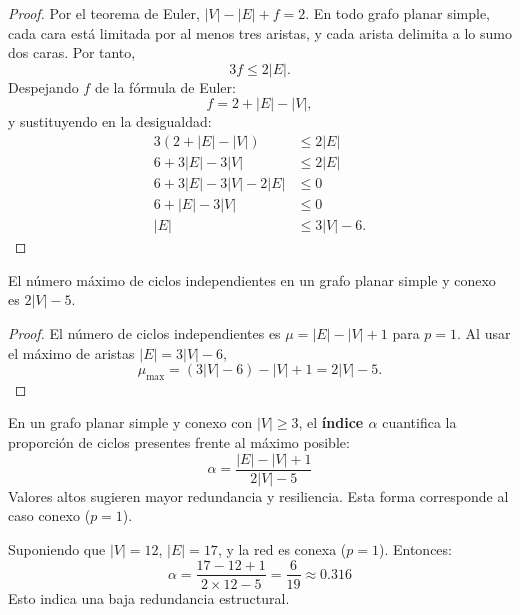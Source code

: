             \begin{proof}
                Por el teorema de Euler, $|V| - |E| + f = 2$.
                En todo grafo planar simple, cada cara está limitada por al menos tres aristas, y cada arista delimita a lo sumo dos caras. Por tanto,
                \[
                3f \leq 2|E|.
                \]
                Despejando $f$ de la fórmula de Euler:
                \[
                f = 2 + |E| - |V|,
                \]
                y sustituyendo en la desigualdad:
                \begin{align*}
                3(2 + |E| - |V|) &\leq 2|E| \\
                6 + 3|E| - 3|V| &\leq 2|E| \\
                6 + 3|E| - 3|V| - 2|E| &\leq 0 \\
                6 + |E| - 3|V| &\leq 0 \\
                |E| &\leq 3|V| - 6.
                \end{align*}
            \end{proof}

            \begin{corolario}
                El número máximo de ciclos independientes en un grafo planar simple y conexo es $2|V| - 5$.
            \end{corolario}

            \begin{proof}
                El número de ciclos independientes es $\mu = |E| - |V| + 1$ para $p=1$.
                Al usar el máximo de aristas $|E| = 3|V|-6$,
                \[
                \mu_{\max} = (3|V|-6) - |V| + 1 = 2|V| - 5.
                \]
            \end{proof}

            \begin{definicion}
                En un grafo planar simple y conexo con $|V|\ge 3$, el \textbf{índice $\alpha$} cuantifica la proporción de ciclos presentes frente al máximo posible:
                \[
                \alpha = \frac{|E| - |V| + 1}{2|V| - 5}
                \]
                Valores altos sugieren mayor redundancia y resiliencia. Esta forma corresponde al caso conexo ($p=1$).
            \end{definicion}

            \begin{ejemplo}
                Suponiendo que $|V| = 12$, $|E| = 17$, y la red es conexa ($p = 1$). Entonces:
                \[
                \alpha = \frac{17 - 12 + 1}{2 \times 12 - 5} = \frac{6}{19} \approx 0.316
                \]
                Esto indica una baja redundancia estructural.
            \end{ejemplo}

